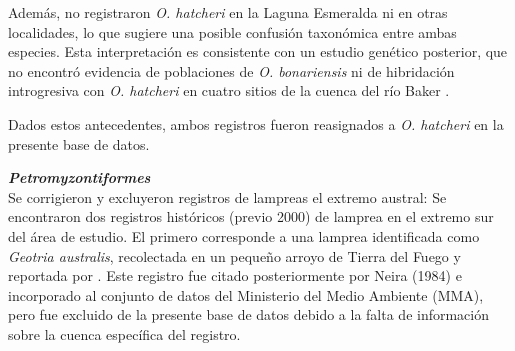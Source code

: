 \documentclass[sn-apa,pdflatex]{sn-jnl}
\newenvironment{Shaded}{\begin{snugshade}}{\end{snugshade}}
\newcommand{\CommentTok}[1]{\textcolor[rgb]{0.56,0.35,0.01}{\textit{#1}}}
\newcommand{\NormalTok}[1]{#1}
\newcommand{\OtherTok}[1]{\textcolor[rgb]{0.56,0.35,0.01}{#1}}
\newcommand{\SpecialCharTok}[1]{\textcolor[rgb]{0.81,0.36,0.00}{\textbf{#1}}}
\newcommand{\StringTok}[1]{\textcolor[rgb]{0.31,0.60,0.02}{#1}}
\begin{document}
Además, \citet{zamaIntroductionAysenChile1984} no registraron \emph{O.
hatcheri} en la Laguna Esmeralda ni en otras localidades, lo que sugiere
una posible confusión taxonómica entre ambas especies. Esta
interpretación es consistente con un estudio genético posterior, que no
encontró evidencia de poblaciones de \emph{O. bonariensis} ni de
hibridación introgresiva con \emph{O. hatcheri} en cuatro sitios de la
cuenca del río Baker \citep{Rueda2017}.

Dados estos antecedentes, ambos registros fueron reasignados a \emph{O.
hatcheri} en la presente base de datos.

\begin{Shaded}
\end{Shaded}

\textbf{\emph{Petromyzontiformes}}\\
Se corrigieron y excluyeron registros de lampreas el extremo austral: Se
encontraron dos registros históricos (previo 2000) de lamprea en el
extremo sur del área de estudio. El primero corresponde a una lamprea
identificada como \emph{Geotria australis}, recolectada en un pequeño
arroyo de Tierra del Fuego y reportada por \citet{Norman1937}. Este
registro fue citado posteriormente por Neira (1984) e incorporado al
conjunto de datos del Ministerio del Medio Ambiente (MMA), pero fue
excluido de la presente base de datos debido a la falta de información
sobre la cuenca específica del registro.
\end{document}
